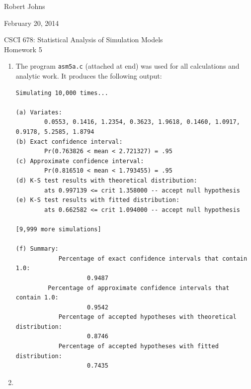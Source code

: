 \documentclass[11pt]{article} %
\begin{document}
\hfill Robert Johns

\hfill February 20, 2014

\begin{center} {\Large CSCI 678: Statistical Analysis of Simulation Models}\\{\large Homework 5}\end{center}

\begin{enumerate}

\item The program \texttt{asm5a.c} (attached at end) was used for all calculations and analytic work.  It produces the following output:

\begin{verbatim}Simulating 10,000 times...

(a) Variates:
        0.0553, 0.1416, 1.2354, 0.3623, 1.9618, 0.1460, 1.0917, 0.9178, 5.2585, 1.8794
(b) Exact confidence interval:
        Pr(0.763826 < mean < 2.721327) = .95
(c) Approximate confidence interval:
        Pr(0.816510 < mean < 1.793455) = .95
(d) K-S test results with theoretical distribution:
        ats 0.997139 <= crit 1.358000 -- accept null hypothesis
(e) K-S test results with fitted distribution:
        ats 0.662582 <= crit 1.094000 -- accept null hypothesis

[9,999 more simulations]

(f) Summary:
        	Percentage of exact confidence intervals that contain 1.0:
                	0.9487
         Percentage of approximate confidence intervals that contain 1.0:
                	0.9542
        	Percentage of accepted hypotheses with theoretical distribution:
                	0.8746
        	Percentage of accepted hypotheses with fitted distribution:
                	0.7435\end{verbatim}

\item


\end{enumerate}
\end{document}
